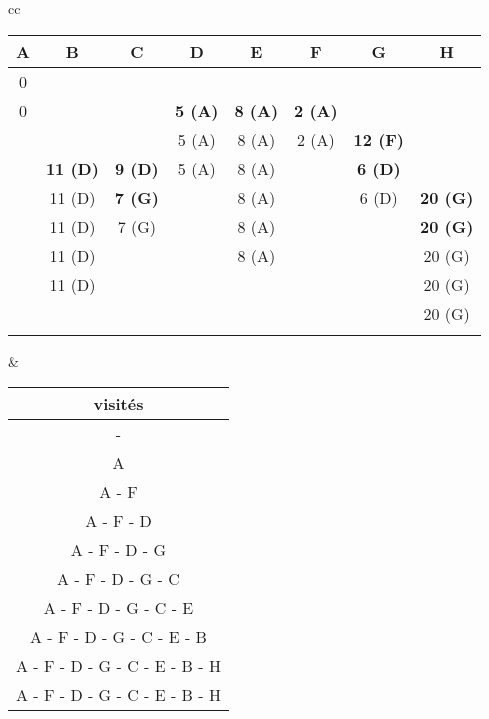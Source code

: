 \documentclass[a4paper,11pt]{article}
\begin{document}
    \begin{tabular}{cc}
        \begin{tabular}{|*{8}{c|}}
            \hline
            A & B      & C      & D      & E      & F   &G&H   \\
            \hline
            0 & \infty & \infty & \infty & \infty & \infty&\infty&\infty\\
            \hline
            0 & \infty & \infty & \textbf{5 (A)} & \textbf{8 (A)} & \textbf{2 (A)}&\infty&\infty\\
            \hline
            \cellcolor{gray} & \infty & \infty & 5 (A) & 8 (A) & 2 (A)&\textbf{12 (F)}&\infty\\
            \hline
            \cellcolor{gray} & \textbf{11 (D)} & \textbf{9 (D)} & 5 (A) & 8 (A) & \cellcolor{gray}&\textbf{6 (D)}&\infty\\
            \hline
            \cellcolor{gray} & 11 (D) & \textbf{7 (G)} & \cellcolor{gray} & 8 (A) & \cellcolor{gray}&6 (D)&\textbf{20 (G)}\\
            \hline
            \cellcolor{gray} & 11 (D) & 7 (G) & \cellcolor{gray} & 8 (A) & \cellcolor{gray}&\cellcolor{gray}&\textbf{20 (G)}\\
            \hline
            \cellcolor{gray} & 11 (D) & \cellcolor{gray} & \cellcolor{gray} & 8 (A) & \cellcolor{gray}&\cellcolor{gray}&20 (G)\\
            \hline
            \cellcolor{gray} & 11 (D) & \cellcolor{gray} & \cellcolor{gray} & \cellcolor{gray} & \cellcolor{gray}&\cellcolor{gray}&20 (G)\\
            \hline
            \cellcolor{gray} & \cellcolor{gray} & \cellcolor{gray} & \cellcolor{gray} & \cellcolor{gray} & \cellcolor{gray}&\cellcolor{gray}&20 (G)\\
            \hline
            \cellcolor{gray} & \cellcolor{gray} & \cellcolor{gray} & \cellcolor{gray} & \cellcolor{gray} & \cellcolor{gray}&\cellcolor{gray}&\cellcolor{gray}\\
            \hline
        \end{tabular}
        &
        \begin{tabular}{|c|}
            \hline
            visités\\
            \hline
            -\\
            \hline
            A\\
            \hline
            A - F\\
            \hline
            A - F - D\\
            \hline
            A - F - D - G\\
            \hline
            A - F - D - G - C\\
            \hline
            A - F - D - G - C - E\\
            \hline
            A - F - D - G - C - E - B\\
            \hline
            A - F - D - G - C - E - B - H\\
            \hline
            A - F - D - G - C - E - B - H\\
            \hline
        \end{tabular}
    \end{tabular}
\end{document}
